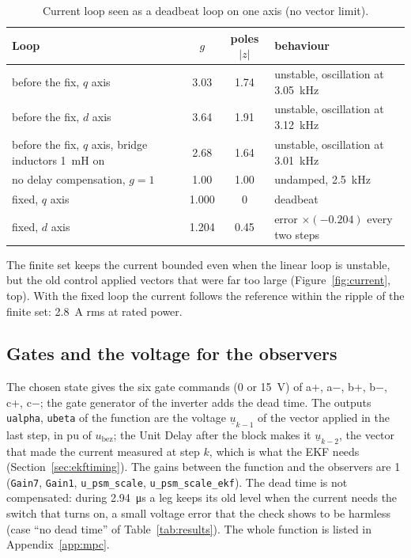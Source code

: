 \documentclass[11pt,a4paper]{scrartcl}
\newcommand{\ped}[1]{_{\mathrm{#1}}}
\newcommand{\code}[1]{\texttt{#1}}
\begin{document}
\begin{onehalfspace}
\begin{table}[H]
	\centering
	\footnotesize
	\caption{Current loop seen as a deadbeat loop on one axis (no vector limit).}
	\label{tab:deadbeat}
	\begin{tabular}{@{} l c c l @{}}
		\toprule
		\textbf{Loop} & $g$ & \textbf{poles} $|z|$ & \textbf{behaviour} \\
		\midrule
		before the fix, $q$ axis & 3.03 & 1.74 & unstable, oscillation at \SI{3.05}{\kilo\hertz} \\
		before the fix, $d$ axis & 3.64 & 1.91 & unstable, oscillation at \SI{3.12}{\kilo\hertz} \\
		before the fix, $q$ axis, bridge inductors \SI{1}{\milli\henry} on & 2.68 & 1.64 & unstable, oscillation at \SI{3.01}{\kilo\hertz} \\
		no delay compensation, $g = 1$ & 1.00 & 1.00 & undamped, \SI{2.5}{\kilo\hertz} \\
		fixed, $q$ axis & 1.000 & 0 & deadbeat \\
		fixed, $d$ axis & 1.204 & 0.45 & error $\times(-0.204)$ every two steps \\
		\bottomrule
	\end{tabular}
\end{table}

The finite set keeps the current bounded even when the linear loop is unstable, but the old control applied vectors that were far too large (Figure~\ref{fig:current}, top). With the fixed loop the current follows the reference within the ripple of the finite set: \SI{2.8}{\ampere} rms at rated power.

\subsection{Gates and the voltage for the observers}
\label{sec:mpcout}

The chosen state gives the six gate commands (\SI{0}{} or \SI{15}{\volt}) of a+, a$-$, b+, b$-$, c+, c$-$; the gate generator of the inverter adds the dead time. The outputs \code{ualpha}, \code{ubeta} of the function are the voltage $\underline{u}_{k-1}$ of the vector applied in the last step, in pu of $u\ped{bez}$; the Unit Delay after the block makes it $\underline{u}_{k-2}$, the vector that made the current measured at step $k$, which is what the EKF needs (Section~\ref{sec:ekftiming}). The gains between the function and the observers are 1 (\code{Gain7}, \code{Gain1}, \code{u\_psm\_scale}, \code{u\_psm\_scale\_ekf}). The dead time is not compensated: during \SI{2.94}{\micro\second} a leg keeps its old level when the current needs the switch that turns on, a small voltage error that the check shows to be harmless (case ``no dead time'' of Table~\ref{tab:results}). The whole function is listed in Appendix~\ref{app:mpc}.


\end{onehalfspace}
\end{document}
